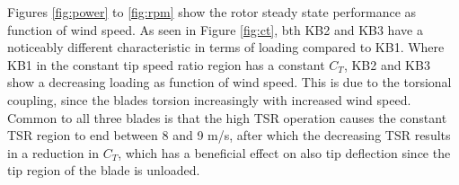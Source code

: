 \begin{table}[]
\centering
\caption{My caption}
\label{my-label}
\end{table}

Figures \ref{fig:power} to \ref{fig:rpm} show the rotor steady state performance as function of wind speed.
As seen in Figure \ref{fig:ct}, bth KB2 and KB3 have a noticeably different characteristic in terms of loading compared to KB1.
Where KB1 in the constant tip speed ratio region has a constant $C_T$, KB2 and KB3 show a decreasing loading as function of wind speed.
This is due to the torsional coupling, since the blades torsion increasingly with increased wind speed.
Common to all three blades is that the high TSR operation causes the constant TSR region to end between 8 and 9 m/s, after which the decreasing TSR results in a reduction in $C_T$, which has a beneficial effect on also tip deflection since the tip region of the blade is unloaded.

